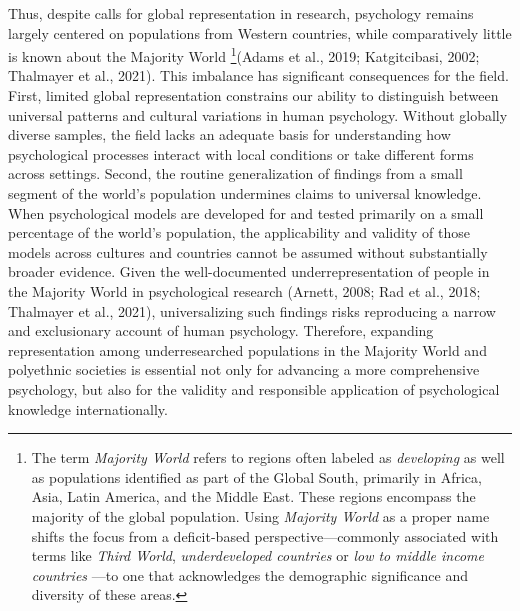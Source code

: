\documentclass[
  11pt,
]{book}
\begin{document}
Thus, despite calls for global representation in research, psychology remains largely centered on populations from Western countries, while comparatively little is known about the Majority World \footnote{The term \emph{Majority World} refers to regions often labeled as \emph{developing} as well as populations identified as part of the Global South, primarily in Africa, Asia, Latin America, and the Middle East. These regions encompass the majority of the global population. Using \emph{Majority World} as a proper name shifts the focus from a deficit-based perspective---commonly associated with terms like \emph{Third World}, \emph{underdeveloped countries} or \emph{low to middle income countries} ---to one that acknowledges the demographic significance and diversity of these areas.}(Adams et al., 2019; Katgitcibasi, 2002; Thalmayer et al., 2021). This imbalance has significant consequences for the field. First, limited global representation constrains our ability to distinguish between universal patterns and cultural variations in human psychology. Without globally diverse samples, the field lacks an adequate basis for understanding how psychological processes interact with local conditions or take different forms across settings. Second, the routine generalization of findings from a small segment of the world's population undermines claims to universal knowledge. When psychological models are developed for and tested primarily on a small percentage of the world's population, the applicability and validity of those models across cultures and countries cannot be assumed without substantially broader evidence. Given the well-documented underrepresentation of people in the Majority World in psychological research (Arnett, 2008; Rad et al., 2018; Thalmayer et al., 2021), universalizing such findings risks reproducing a narrow and exclusionary account of human psychology. Therefore, expanding representation among underresearched populations in the Majority World and polyethnic societies is essential not only for advancing a more comprehensive psychology, but also for the validity and responsible application of psychological knowledge internationally.
\end{document}
